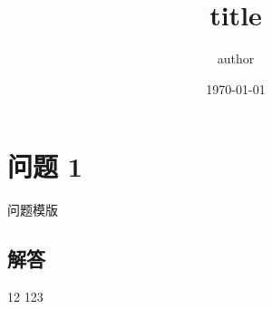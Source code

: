\documentclass[12pt]{article}
\begin{document}
\title{title}
\author{author}
\date{\today}
\maketitle


\newpage
\section*{问题 1}
\begin{tcolorbox}
问题模版
\end{tcolorbox}

\subsection*{解答}

12\cite{avellaneda2008high}
123\cite{aabb}





\newpage


\end{document}
